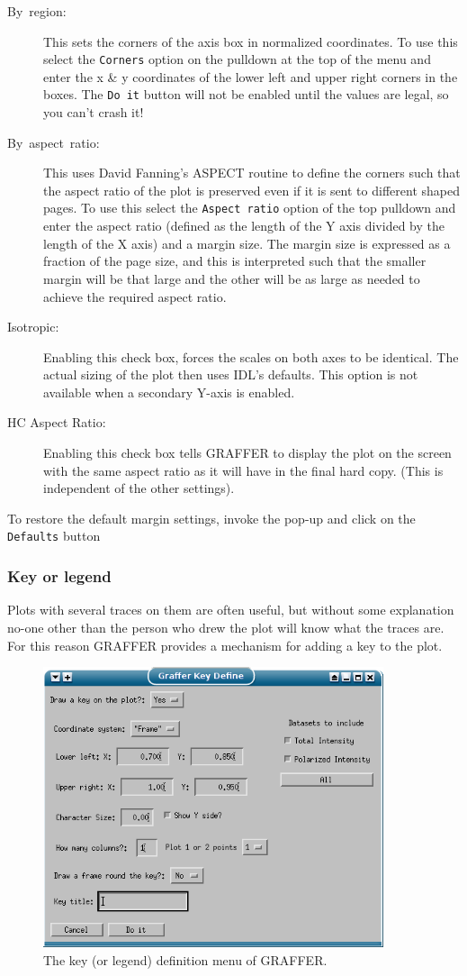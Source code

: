 \documentclass[11pt,twoside,english]{article}
\begin{document}
\begin{description}
\item [By~region:]This sets the corners of the axis box in normalized
  coordinates. To use this select the \texttt{Corners} option on the
  pulldown at the top of the menu and enter the x \& y coordinates of
  the lower left and upper right corners in the boxes. The \texttt{Do
    it} button will not be enabled until the values are legal, so you
  can't crash it!
\item [By~aspect~ratio:]This uses David Fanning's ASPECT routine to
  define the corners such that the aspect ratio of the plot is
  preserved even if it is sent to different shaped pages. To use this
  select the \texttt{Aspect ratio} option of the top pulldown and enter
  the aspect ratio (defined as the length of the Y axis divided by the
  length of the X axis) and a margin size. The margin size is expressed
  as a fraction of the page size, and this is interpreted such that the
  smaller margin will be that large and the other will be as large as
  needed to achieve the required aspect ratio.
\item[Isotropic:] Enabling this check box, forces the scales on both
  axes to be identical. The actual sizing of the plot then uses IDL's
  defaults. This option is not available when a secondary Y-axis is
  enabled.
\item[HC Aspect Ratio:] Enabling this check box tells GRAFFER to
  display the plot on the screen with the same aspect ratio as it will
  have in the final hard copy. (This is independent of the other
  settings).
\end{description}
To restore the default margin settings, invoke the pop-up and click on
the \texttt{Defaults} button


\subsubsection{Key or legend}

Plots with several traces on them are often useful, but without some
explanation no-one other than the person who drew the plot will know
what the traces are. For this reason GRAFFER provides a mechanism for
adding a key to the plot.
\begin{figure}[htbp]
  \centering
  \includegraphics[width=10cm]{key}
  \caption{The key (or legend) definition menu of GRAFFER.}
  \label{key menu}
\end{figure}
\end{document}
